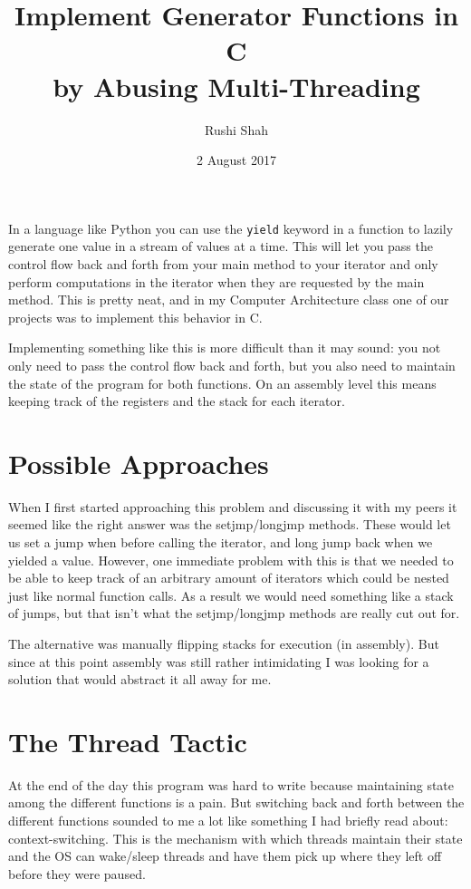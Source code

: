 \documentclass[12pt]{article}
\title{Implement Generator Functions in C \\ by Abusing Multi-Threading}
\author{Rushi Shah}
\date{2 August 2017}
\begin{document}
  \maketitle

  In a language like Python you can use the \texttt{yield} keyword in a function to lazily generate one value in a stream of values at a time. This will let you pass the control flow back and forth from your main method to your iterator and only perform computations in the iterator when they are requested by the main method. This is pretty neat, and in my Computer Architecture class one of our projects was to implement this behavior in C. 

  Implementing something like this is more difficult than it may sound: you not only need to pass the control flow back and forth, but you also need to maintain the state of the program for both functions. On an assembly level this means keeping track of the registers and the stack for each iterator.    

  \section{Possible Approaches}

  When I first started approaching this problem and discussing it with my peers it seemed like the right answer was the setjmp/longjmp methods. These would let us set a jump when before calling the iterator, and long jump back when we yielded a value. However, one immediate problem with this is that we needed to be able to keep track of an arbitrary amount of iterators which could be nested just like normal function calls. As a result we would need something like a stack of jumps, but that isn't what the setjmp/longjmp methods are really cut out for.

  The alternative was manually flipping stacks for execution (in assembly). But since at this point assembly was still rather intimidating I was looking for a solution that would abstract it all away for me. 

  \section{The Thread Tactic}

    At the end of the day this program was hard to write because maintaining state among the different functions is a pain. But switching back and forth between the different functions sounded to me a lot like something I had briefly read about: context-switching. This is the mechanism with which threads maintain their state and the OS can wake/sleep threads and have them pick up where they left off before they were paused. 
\end{document}

